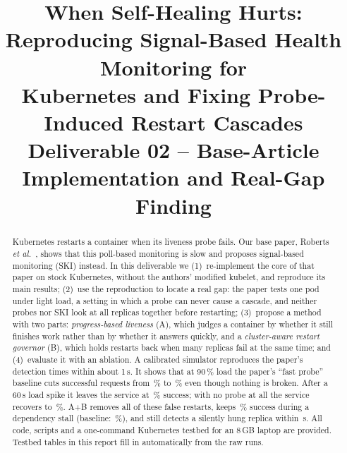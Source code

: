 \documentclass[conference]{IEEEtran}
\begin{document}
\title{When Self-Healing Hurts:\\ Reproducing Signal-Based Health Monitoring for\\
Kubernetes and Fixing Probe-Induced Restart Cascades\\[2pt]
\large Deliverable 02 -- Base-Article Implementation and Real-Gap Finding}

\author{
\and
{}
}

\maketitle

\begin{abstract}
Kubernetes restarts a container when its liveness probe fails. Our base
paper, Roberts \emph{et al.}~\cite{roberts2025}, shows that this
poll-based monitoring is slow and proposes signal-based monitoring
(SKI) instead. In this deliverable we (1)~re-implement the core of that
paper on stock Kubernetes, without the authors' modified kubelet, and
reproduce its main results; (2)~use the reproduction to locate a real
gap: the paper tests one pod under light load, a setting in which a
probe can never cause a cascade, and neither probes nor SKI look at all
replicas together before restarting; (3)~propose a method with two
parts: \emph{progress-based liveness} (A), which judges a container by
whether it still finishes work rather than by whether it answers
quickly, and a \emph{cluster-aware restart governor} (B), which holds
restarts back when many replicas fail at the same time; and (4)~evaluate
it with an ablation. A calibrated simulator reproduces the paper's
detection times within about 1\,s. It shows that at 90\,\% load the
paper's ``fast probe'' baseline cuts successful requests from
\simOnineNONEsucc\,\% to \simOnineFPsucc\,\% even though nothing is
broken. After a 60\,s load spike it leaves the service at
\simPFPpost\,\% success; with no probe at all the service recovers to
\simPNONEpost\,\%. A+B removes all of these false restarts, keeps
\simDABsucc\,\% success during a dependency stall
(baseline: \simDFPsucc\,\%), and still detects a silently hung
replica within \simHABdet\,s. All code, scripts and a one-command
Kubernetes testbed for an 8\,GB laptop are provided. Testbed tables in
this report fill in automatically from the raw runs.
\end{abstract}
\end{document}
